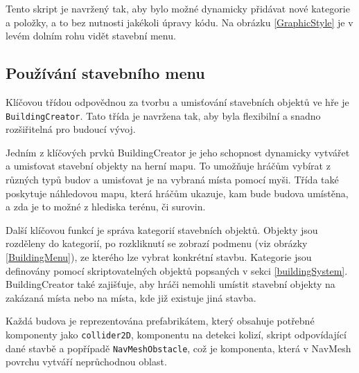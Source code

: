 Tento skript je navržený tak, aby bylo možné dynamicky přidávat nové kategorie a položky, a to bez nutnosti jakékoli úpravy kódu. Na obrázku \ref{GraphicStyle} je v levém dolním rohu vidět stavební menu.

\subsection{Používání stavebního menu}
Klíčovou třídou odpovědnou za tvorbu a umisťování stavebních objektů ve hře je \newline \texttt{BuildingCreator}. Tato třída je navržena tak, aby byla flexibilní a snadno rozšiřitelná pro budoucí vývoj.

Jedním z klíčových prvků BuildingCreator je jeho schopnost dynamicky vytvářet a umisťovat stavební objekty na herní mapu. To umožňuje hráčům vybírat z různých typů budov a umisťovat je na vybraná místa pomocí myši. Třída také poskytuje náhledovou mapu, která hráčům ukazuje, kam bude budova umístěna, a zda je to možné z hlediska terénu, či surovin.

Další klíčovou funkcí je správa kategorií stavebních objektů. Objekty jsou rozděleny do kategorií, po rozkliknutí se zobrazí podmenu (viz obrázky \ref{BuildingMenu}), ze kterého lze vybrat konkrétní stavbu. Kategorie jsou definovány pomocí skriptovatelných objektů popsaných v sekci \ref{buildingSystem}. BuildingCreator také zajišťuje, aby hráči nemohli umístit stavební objekty na zakázaná místa nebo na místa, kde již existuje jiná stavba. 

Každá budova je reprezentována prefabrikátem, který obsahuje potřebné komponenty jako \texttt{collider2D}, komponentu na detekci kolizí, skript odpovídající dané stavbě a popřípadě \texttt{NavMeshObstacle}, což je komponenta, která v NavMesh povrchu vytváří neprůchodnou oblast.

